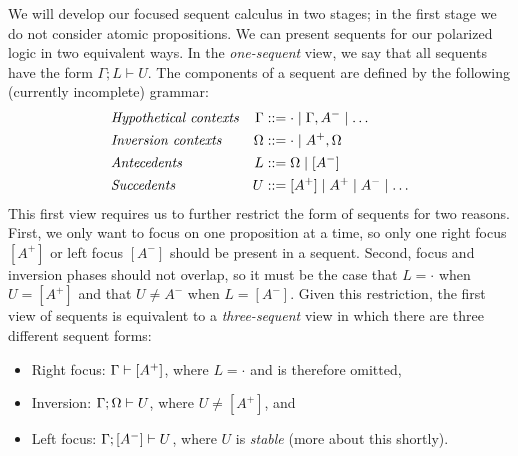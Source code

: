 \documentclass[acmtocl]{robtrans}\pdfoutput=1
\newcommand{\efoc}[3]{{#1}; {#2} \vdash {#3}}
\newcommand{\rfoc}[2]{{#1} \vdash [{#2}] \mathstrut}
\newcommand{\lfoc}[3]{{#1}; [{#2}] \vdash {#3} \mathstrut}
\newcommand{\ifoc}[3]{{#1}; {#2} \vdash {#3} \mathstrut}
\begin{document}
We will develop our focused sequent calculus in two stages; in the
first stage we do not consider atomic propositions. We can present
sequents for our polarized logic in two equivalent ways. In the {\it
  one-sequent} view, we say that all sequents have the form
$\efoc{\Gamma}{L}{U}$. The components of a sequent are defined by the
following (currently incomplete) grammar:
\begin{align*}
& \mbox{\it Hypothetical contexts} & 
\Gamma & ::= \cdot \mid \Gamma, A^- \mid \ldots
\\
& \mbox{\it Inversion contexts} &
\Omega & ::= \cdot \mid A^+, \Omega
\\
& \mbox{\it Antecedents} & 
L & ::= \Omega \mid [A^-]
\\
& \mbox{\it Succedents} & 
U & ::= [A^+] \mid A^+ \mid A^- \mid \ldots
\end{align*}
This first view requires us to further restrict the form of sequents
for two reasons. First, we only want to focus on one proposition at a
time, so only one right focus $[A^+]$ or left focus $[A^-]$ should be
present in a sequent.  Second, focus and inversion phases should not
overlap, so it must be the case that $L = \cdot$ when $U = [A^+]$ and
that $U \neq A^-$ when $L = [A^-]$. Given this
restriction, the first view of sequents is equivalent to a {\it
  three-sequent} view in which there are three different sequent
forms:
\begin{itemize}
\item Right focus: $\rfoc{\Gamma}{A^+}$, where $L = \cdot$ and is
  therefore omitted,
\item Inversion: $\ifoc{\Gamma}{\Omega}{U}$, where $U \neq [A^+]$, and
\item Left focus: $\lfoc{\Gamma}{A^-}{U}$, where $U$ is {\it stable}
  (more about this shortly).
\end{itemize}
\end{document}
